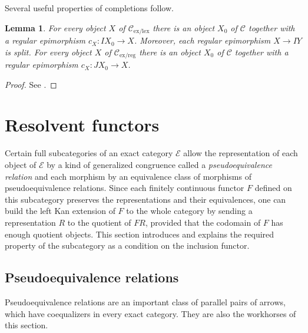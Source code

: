 \documentclass[sort&compress]{elsarticle}
\theoremstyle{plain}
\newtheorem{lemma}[theorem]{Lemma}
\theoremstyle{definition}
\theoremstyle{remark}
\newcommand\cat\mathcal
\newcommand\exlex{_\mathrm{ex/lex}}
\newcommand\exreg{_\mathrm{ex/reg}}
\begin{document}
\newcommand\id{\mathrm{id}}
Several useful properties of completions follow.

\begin{lemma} For every object $X$ of $\cat C\exlex$ there is an object $X_0$ of $\cat C$ together with a regular epimorphism $c_X:IX_0 \to X$. Moreover, each regular epimorphism $X\to IY$ is split. For every object $X$ of $\cat C\exreg$ there is an object $X_0$ of $\cat C$ together with a regular epimorphism $c_X:JX_0 \to X$.\label{proj} \end{lemma}

\begin{proof} See \citet{MR1600009}. \end{proof}

\section{Resolvent functors}
Certain full subcategories of an exact category $\cat E$ allow the representation of each object of $\cat E$ by a kind of generalized congruence called a \emph{pseudoequivalence relation} and each morphism by an equivalence class of morphisms of pseudoequivalence relations. Since each finitely continuous functor $F$ defined on this subcategory preserves the representations and their equivalences, one can build the left Kan extension of $F$ to the whole category by sending a representation $R$ to the quotient of $FR$, provided that the codomain of $F$ has enough quotient objects. This section introduces and explains the required property of the subcategory as a condition on the inclusion functor.

\subsection{Pseudoequivalence relations} 
Pseudoequivalence relations are an important class of parallel pairs of arrows, which have coequalizers in every exact category. They are also the workhorses of this section.
\end{document}
